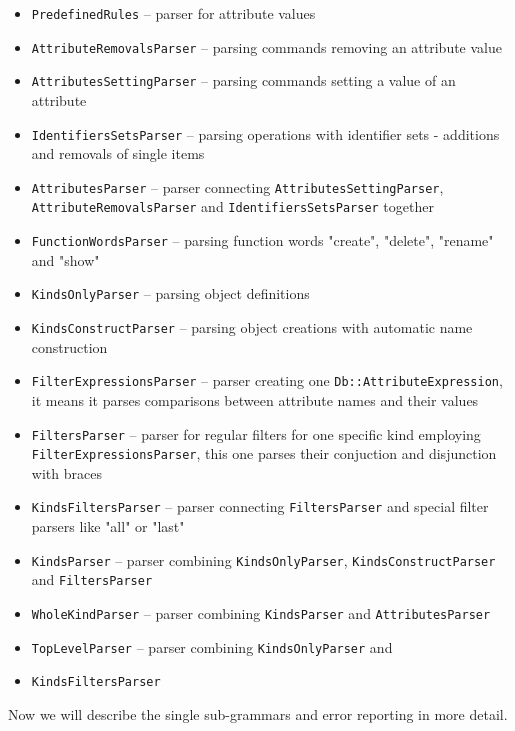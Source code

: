 \documentclass[deska]{subfiles}
\begin{document}
\begin{itemize}
    \item {\tt PredefinedRules} -- parser for attribute values
    \item {\tt AttributeRemovalsParser} -- parsing commands removing an attribute value
    \item {\tt AttributesSettingParser} -- parsing commands setting a value of an attribute 
    \item {\tt IdentifiersSetsParser} -- parsing operations with identifier sets - additions and removals of single items
    \item {\tt AttributesParser} -- parser connecting {\tt AttributesSettingParser}, {\tt AttributeRemovalsParser} and
                                    {\tt IdentifiersSetsParser} together 
    \item {\tt FunctionWordsParser} -- parsing function words "create", "delete", "rename" and "show"
    \item {\tt KindsOnlyParser} -- parsing object definitions
    \item {\tt KindsConstructParser} -- parsing object creations with automatic name construction
    \item {\tt FilterExpressionsParser} -- parser creating one {\tt Db::AttributeExpression}, it means it parses comparisons between
                                           attribute names and their values
    \item {\tt FiltersParser} -- parser for regular filters for one specific kind employing {\tt FilterExpressionsParser}, this one parses
                                 their conjuction and disjunction with braces 
    \item {\tt KindsFiltersParser} -- parser connecting {\tt FiltersParser} and special filter parsers like "all" or "last" 
    \item {\tt KindsParser} -- parser combining {\tt KindsOnlyParser}, {\tt KindsConstructParser} and {\tt FiltersParser}
    \item {\tt WholeKindParser} -- parser combining {\tt KindsParser} and {\tt AttributesParser}  
    \item {\tt TopLevelParser} -- parser combining {\tt KindsOnlyParser} and \item {\tt KindsFiltersParser}
\end{itemize}


Now we will describe the single sub-grammars and error reporting in more detail.
\end{document}

